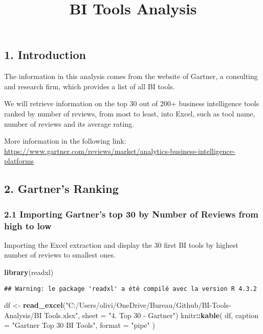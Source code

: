 \documentclass[
]{article}
\title{BI Tools Analysis}
\author{}
\date{\vspace{-2.5em}}
\newenvironment{Shaded}{\begin{snugshade}}{\end{snugshade}}
\newcommand{\AttributeTok}[1]{\textcolor[rgb]{0.13,0.29,0.53}{#1}}
\newcommand{\FunctionTok}[1]{\textcolor[rgb]{0.13,0.29,0.53}{\textbf{#1}}}
\newcommand{\NormalTok}[1]{#1}
\newcommand{\OtherTok}[1]{\textcolor[rgb]{0.56,0.35,0.01}{#1}}
\newcommand{\SpecialCharTok}[1]{\textcolor[rgb]{0.81,0.36,0.00}{\textbf{#1}}}
\newcommand{\StringTok}[1]{\textcolor[rgb]{0.31,0.60,0.02}{#1}}
\begin{document}
\maketitle

\subsection{1. Introduction}\label{introduction}

The information in this analysis comes from the website of Gartner, a
consulting and research firm, which provides a list of all BI tools.

We will retrieve information on the top 30 out of 200+ business
intelligence tools ranked by number of reviews, from most to least, into
Excel, such as tool name, number of reviews and its average rating.

More information in the following link:
\url{https://www.gartner.com/reviews/market/analytics-business-intelligence-platforms}

\subsection{2. Gartner's Ranking}\label{gartners-ranking}

\subsubsection{2.1 Importing Gartner's top 30 by Number of Reviews from
high to
low}\label{importing-gartners-top-30-by-number-of-reviews-from-high-to-low}

Importing the Excel extraction and display the 30 first BI tools by
highest number of reviews to smallest ones.

\begin{Shaded}
\begin{Highlighting}[]
\FunctionTok{library}\NormalTok{(readxl)}
\end{Highlighting}
\end{Shaded}

\begin{verbatim}
## Warning: le package 'readxl' a été compilé avec la version R 4.3.2
\end{verbatim}

\begin{Shaded}
\begin{Highlighting}[]
\NormalTok{df }\OtherTok{\textless{}{-}} \FunctionTok{read\_excel}\NormalTok{(}\StringTok{"C:/Users/olivi/OneDrive/Bureau/Github/BI{-}Tools{-}Analysis/BI Tools.xlsx"}\NormalTok{, }\AttributeTok{sheet =} \StringTok{"4. Top 30 {-} Gartner"}\NormalTok{)}
\NormalTok{knitr}\SpecialCharTok{::}\FunctionTok{kable}\NormalTok{(}
\NormalTok{  df,}
  \AttributeTok{caption =} \StringTok{"Gartner Top 30 BI Tools"}\NormalTok{,}
  \AttributeTok{format =} \StringTok{"pipe"}
\NormalTok{)}
\end{Highlighting}
\end{Shaded}
\end{document}
